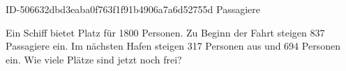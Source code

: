 \begin{exercise}
      {ID-506632dbd3eaba0f763f1f91b4906a7a6d52755d}
      {Passagiere}
  \ifproblem\problem\par
    Ein Schiff bietet Platz für \num{1800} Personen. Zu Beginn der Fahrt steigen 837
    Passagiere ein. Im nächsten Hafen steigen 317 Personen aus und 694 Personen
    ein. Wie viele Plätze sind jetzt noch frei?
  \fi
\end{exercise}
